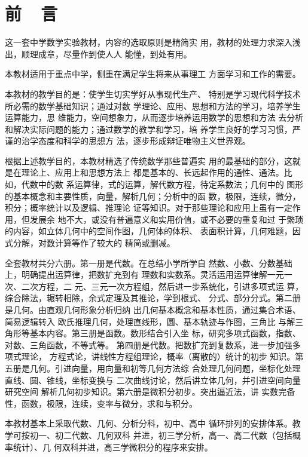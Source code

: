 \chapter{前~~言}

这一套中学数学实验教材，内容的选取原则是精简实
用，教材的处理力求深入浅出，顺理成章，尽量作到使人人
能懂，到处有用。

    本教材适用于重点中学，侧重在满足学生将来从事理工
方面学习和工作的需要。

    本教材的教学目的是：使学生切实学好从事现代生产、
特别是学习现代科学技术所必需的数学基础知识；通过对数
学理论、应用、思想和方法的学习，培养学生运算能力，思
维能力，空间想象力，从而逐步培养运用数学的思想和方法
去分析和解决实际问题的能力；通过数学的教学和学习，培
养学生良好的学习习惯，严谨的治学态度和科学的思想方
法，逐步形成辩证唯物主义世界观。

   根据上述教学目的，本教材精选了传统数学那些普遍实
用的最基础的部分，这就是在理论上、应用上和思想方法上
都是基本的、长远起作用的通性、通法。比如，代数中的数
系运算律，式的运算，解代数方程，待定系数法；几何中的
图形的基本概念和主要性质，向量，解析几何；分析中的函
数，极限，连续，微分，积分；概率统计以及逻辑、推理论
证等知识。对于那些理论和应用上虽有一定作用，但发展余
地不大，或没有普遍意义和实用价值，或不必要的重复和过
于繁琐的内容，如立体几何中的空间作图，几何体的体积、
表面积计算，几何难题，因式分解，对数计算等作了较大的
精简或删减。

    全套教材共分六册。第一册是代数。在总结小学所学自
然数、小数、分数基础上，明确提出运算律，把数扩充到有
理数和实数系。灵活运用运算律解一元一次、二次方程，二
元、三元一次方程组，然后进一步系统化，引进多项式运
算，综合除法，辗转相除，余式定理及其推论，学到根式、
分式、部分分式。第二册是几何。由直观几何形象分析归纳
出几何基本概念和基本性质，通过集合术语、简易逻辑转入
欧氏推理几何，处理直线形，圆、基本轨迹与作图，三角比
与解三角形等基本内容。第三册是函数。数形结合引入坐
标，研究多项式函数，指数、对数、三角函数，不等式等。
第四册是代数。把数扩充到复数系，进一步加强多项式理论，
方程式论，讲线性方程组理论，概率（离散的）统计的初步
知识。第五册是几何。引进向量，用向量和初等几何方法综
合处理几何问题，坐标化处理直线、圆、锥线，坐标变换与
二次曲线讨论，然后讲立体几何，并引进空间向量研究空间
解析几何初步知识。第六册是微积分初步。突出逼近法，讲
实数完备性，函数，极限，连续，变率与微分，求和与积分。

本教材基本上采取代数、几何、分析分科，初中、高中
循环排列的安排体系。教学可按初一、初二代数、几何双科
并进，初三学分析，高一、高二代数（包括概率统计）、几
何双科并进，高三学微积分的程序来安排。

